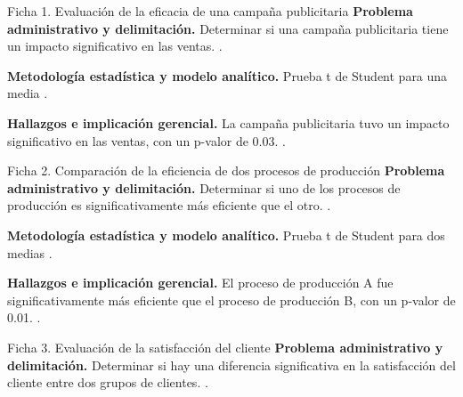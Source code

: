 {
\begin{fichainvestigacion}{Ficha 1. Evaluación de la eficacia de una campaña publicitaria}
\textbf{Problema administrativo y delimitación.} Determinar si una campaña publicitaria tiene un impacto significativo en las ventas. \citep{anderson2012,holmesBusiness2023}.

\textbf{Metodología estadística y modelo analítico.} Prueba t de Student para una media \citep{wackerly2010,lind2012}.

\textbf{Hallazgos e implicación gerencial.} La campaña publicitaria tuvo un impacto significativo en las ventas, con un p-valor de 0.03. \citep{nistHandbook}.
\end{fichainvestigacion}

\begin{fichainvestigacion}{Ficha 2. Comparación de la eficiencia de dos procesos de producción}
\textbf{Problema administrativo y delimitación.} Determinar si uno de los procesos de producción es significativamente más eficiente que el otro. \citep{anderson2012,holmesBusiness2023}.

\textbf{Metodología estadística y modelo analítico.} Prueba t de Student para dos medias \citep{wackerly2010,lind2012}.

\textbf{Hallazgos e implicación gerencial.} El proceso de producción A fue significativamente más eficiente que el proceso de producción B, con un p-valor de 0.01. \citep{nistHandbook}.
\end{fichainvestigacion}

\begin{fichainvestigacion}{Ficha 3. Evaluación de la satisfacción del cliente}
\textbf{Problema administrativo y delimitación.} Determinar si hay una diferencia significativa en la satisfacción del cliente entre dos grupos de clientes. \citep{anderson2012,holmesBusiness2023}.


\end{fichainvestigacion}}

